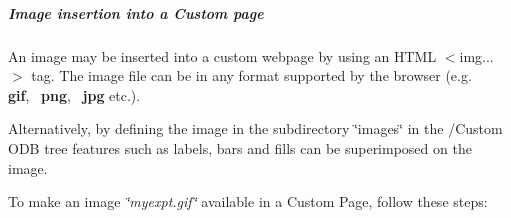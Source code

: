 \par


\par
 \label{RC_mhttpd_Image_access_idx_mhttpd_page_custom_image_insert-image}
\hypertarget{RC_mhttpd_Image_access_idx_mhttpd_page_custom_image_insert-image}{}
 \hypertarget{RC_mhttpd_Image_access_RC_mhttpd_custom_image}{}\subparagraph{Image insertion into a Custom page}\label{RC_mhttpd_Image_access_RC_mhttpd_custom_image}
\label{RC_mhttpd_Image_access_idx_mhttpd_page_custom_image_history-image}
\hypertarget{RC_mhttpd_Image_access_idx_mhttpd_page_custom_image_history-image}{}

\begin{DoxyItemize}
\item An image may be inserted into a custom webpage by using an HTML $<$img...$>$ tag. The image file can be in any format supported by the browser (e.g. ~ {\bfseries gif},~ {\bfseries png},~ {\bfseries jpg} etc.).
\end{DoxyItemize}


\begin{DoxyItemize}
\item Alternatively, by defining the image in the subdirectory \char`\"{}images\char`\"{} in the /Custom ODB tree  features such as labels, bars and fills can be superimposed on the image. \par
 To make an image {\itshape \char`\"{}myexpt.gif\char`\"{}\/} available in a Custom Page, follow these steps:
\end{DoxyItemize}



